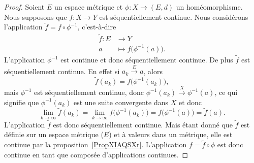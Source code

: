 \begin{proof}
    Soient \( E\) un espace métrique et \( \phi\colon X\to (E,d)\) un homéomorphisme. Nous supposons que \( f\colon X\to Y\) est séquentiellement continue. Nous considérons l'application \( \tilde f=f\circ\phi^{-1}\), c'est-à-dire
    \begin{equation}
        \begin{aligned}
            \tilde f\colon E&\to Y \\
            a&\mapsto f\big( \phi^{-1}(a) \big).
        \end{aligned}
    \end{equation}
    L'application \( \phi^{-1}\) est continue et donc séquentiellement continue. De plus \( \tilde f\) est séquentiellement continue. En effet si \( a_k\stackrel{E}{\longrightarrow}a\), alors
    \begin{equation}
        \tilde f(a_k)=f\big( \phi^{-1}(a_k) \big),
    \end{equation}
    mais \( \phi^{-1}\) est séquentiellement continue, donc \( \phi^{-1}(a_k)\stackrel{X}{\longrightarrow}\phi^{-1}(a)\), ce qui signifie que \( \phi^{-1}(a_k)\) est une suite convergente dans \( X\) et donc
    \begin{equation}
        \lim_{k\to \infty} \tilde f(a_k)=\lim_{k\to \infty} f\big( \phi^{-1}(a_k) \big)=f\big( \phi^{-1}(a) \big)=\tilde f(a).
    \end{equation}
    L'application \( \tilde f\) est donc séquentiellement continue. Mais étant donné que \( \tilde f\) est définie sur un espace métrique (\( E\)) et à valeurs dans un métrique, elle est continue par la proposition~\ref{PropXIAQSXr}. L'application \( f=\tilde f\circ\phi\) est donc continue en tant que composée d'applications continues.
\end{proof}

